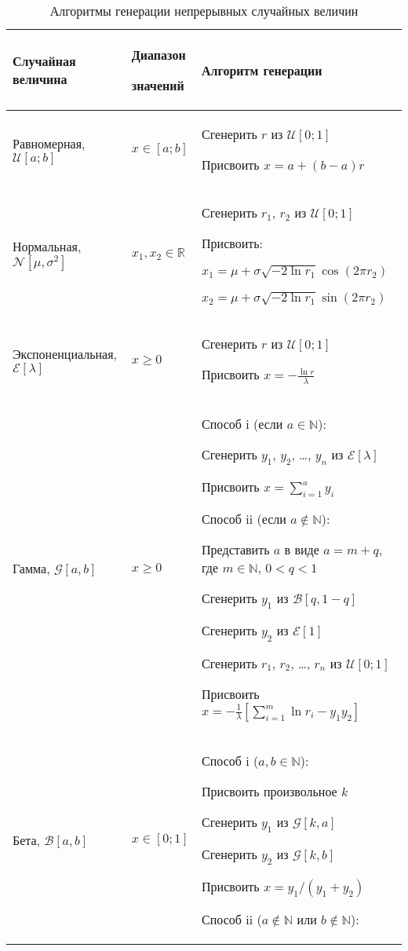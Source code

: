 \begin{table}[h]
\caption{\label{tab:algo} Алгоритмы генерации непрерывных случайных величин}
\begin{tabular}{p{5cm}p{2cm}p{9cm}}
\hline 
\hline
Случайная величина & Диапазон 

значений & Алгоритм генерации \\
\hline
Равномерная, $\mathcal{U}[a;b]$ & $x \in [a;b]$ & Сгенерить $r$ из $\mathcal{U}[0;1]$ 

Присвоить $x=a+(b-a)r$ \\
Нормальная, $\mathcal{N}[\mu,\sigma^2]$ & $ x_1,x_2 \in \mathbb{R}$ &  Сгенерить $r_1$, $r_2$ из $\mathcal{U}[0;1]$ 

Присвоить:

\hspace{0.5cm} $x_1=\mu+\sigma\sqrt{-2\ln r_1}\cos(2\pi r_2)$ 

\hspace{0.5cm} $x_2=\mu+\sigma\sqrt{-2\ln r_1}\sin(2\pi r_2)$ \\ 
Экспоненциальная, $\mathcal{E}[\lambda]$ & $x \geq 0$  & Сгенерить $r$ из $\mathcal{U}[0;1]$ 

Присвоить $x=-\frac{\ln r}{\lambda}$ \\
Гамма, $\mathcal{G}[a,b]$ & $x \geq 0$ & Способ i (если $a \in \mathbb{N}$):

Сгенерить $y_1$, $y_2$, \ldots, $y_n$ из $\mathcal{E}[\lambda]$ 

Присвоить $x=\sum_{i=1}^a y_i$

Способ ii (если $a \notin \mathbb{N}$):

Представить $a$ в виде $a=m+q$, где $m\in \mathbb{N}$, $0<q<1$

Сгенерить $y_1$ из $\mathcal{B}[q,1-q]$

Сгенерить $y_2$ из $\mathcal{E}[1]$

Сгенерить $r_1$, $r_2$, \ldots, $r_n$ из $\mathcal{U}[0;1]$

Присвоить $x=-\frac{1}{\lambda}[\sum_{i=1}^m \ln r_i - y_1y_2]$ \\
Бета, $\mathcal{B}[a,b]$ & $x \in [0;1] $ & Способ i ($a,b \in \mathbb{N}$): 

Присвоить произвольное $k$

Сгенерить $y_1$ из $\mathcal{G}[k,a]$

Сгенерить $y_2$ из $\mathcal{G}[k,b]$

Присвоить $x=y_1/(y_1+y_2)$

Способ ii ($a \notin \mathbb{N}$ или $b \notin \mathbb{N}$): 


\end{tabular}
\end{table}
